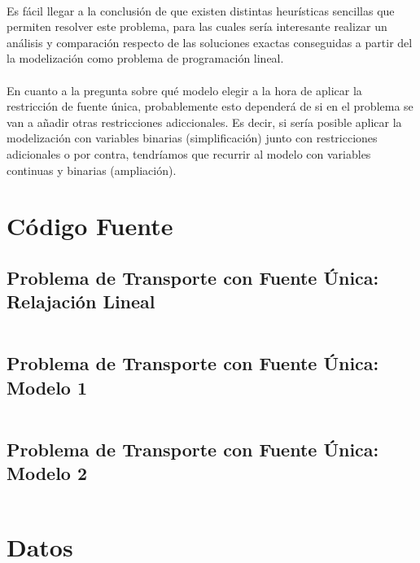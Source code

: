 \documentclass[a4paper, spanish]{article}
\begin{document}
    \paragraph{}
    Es fácil llegar a la conclusión de que existen distintas heurísticas sencillas que permiten resolver este problema, para las cuales sería interesante realizar un análisis y comparación respecto de las soluciones exactas conseguidas a partir del la modelización como problema de programación lineal.

    \paragraph{}
    En cuanto a la pregunta sobre qué modelo elegir a la hora de aplicar la restricción de fuente única, probablemente esto dependerá de si en el problema se van a añadir otras restricciones adiccionales. Es decir, si sería posible aplicar la modelización con variables binarias (simplificación) junto con restricciones adicionales o por contra, tendríamos que recurrir al modelo con variables continuas y binarias (ampliación).

  \begin{appendices}

    \section{Código Fuente}
    \label{appendix:source-code}

      \subsection{Problema de Transporte con Fuente Única: Relajación Lineal}
      \label{appendix:source-code-relaxation}

        \inputminted{text}{./../mosel/single-source-transportation-problem-relaxation.mos}

      \subsection{Problema de Transporte con Fuente Única: Modelo 1}
      \label{appendix:source-code-model-1}

        \inputminted{text}{./../mosel/single-source-transportation-problem-model-1.mos}

      \subsection{Problema de Transporte con Fuente Única: Modelo 2}
      \label{appendix:source-code-model-2}

        \inputminted{text}{./../mosel/single-source-transportation-problem-model-2.mos}

    \section{Datos}
    \label{appendix:data}

      \inputminted{text}{./../mosel/data.dat}

  \end{appendices}



  \nocite{subject:pent2017}
  \nocite{tool:xpress-mosel}
  \nocite{repository:network-flow-transeuro}

  
  
\end{document}
